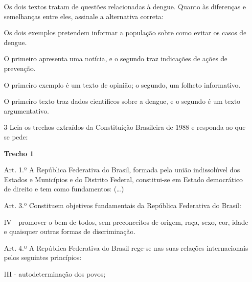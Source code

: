 Os dois textos tratam de questões relacionadas à dengue. Quanto às diferenças
e semelhanças entre eles, assinale a alternativa correta:

\begin{escolha}

    \item Os dois exemplos pretendem informar a população sobre como evitar os casos de dengue.

    \item O primeiro apresenta uma notícia, e o segundo traz indicações de ações de prevenção.

    \item O primeiro exemplo é um texto de opinião; o segundo, um folheto informativo.

    \item O primeiro texto traz dados científicos sobre a dengue, e o segundo é um texto argumentativo.

\end{escolha}

\num{3} Leia os trechos extraídos da Constituição Brasileira de 1988 e responda
ao que se pede:

\begin{myquote}

\textbf{Trecho 1}

Art. 1.º A República Federativa do Brasil, formada pela união
indissolúvel dos Estados e Municípios e do Distrito Federal,
constitui-se em Estado democrático de direito e tem como fundamentos: (\ldots{})

Art. 3.º Constituem objetivos fundamentais da República Federativa do
Brasil:

IV - promover o bem de todos, sem preconceitos de origem, raça, sexo,
cor, idade e quaisquer outras formas de discriminação.

Art. 4.º A República Federativa do Brasil rege-se nas suas relações
internacionais pelos seguintes princípios:

III - autodeterminação dos povos;

\end{myquote}

